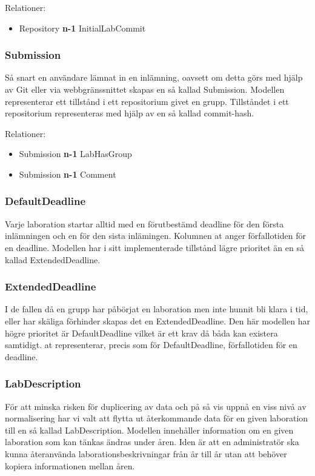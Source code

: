 Relationer: 
\begin{itemize}
  \item Repository {\bf n-1} InitialLabCommit 
\end{itemize}

\subsubsection{Submission}
Så snart en användare lämnat in en inlämning, oavsett om detta görs med hjälp av Git eller via webbgränssnittet skapas en så kallad Submission. Modellen representerar ett tillstånd i ett repositorium givet en grupp. Tillståndet i ett repositorium representeras med hjälp av en så kallad commit-hash.

Relationer: 
\begin{itemize}
  \item Submission {\bf n-1} LabHasGroup 
  \item Submission {\bf n-1} Comment
\end{itemize}

\subsubsection{DefaultDeadline}
Varje laboration startar alltid med en förutbestämd deadline för den första inlämningen och en för den sista inlämingen. Kolumnen at anger förfallotiden för en deadline. Modellen har i sitt implementerade tillstånd lägre prioritet än en så kallad ExtendedDeadline.

\subsubsection{ExtendedDeadline}
I de fallen då en grupp har påbörjat en laboration men inte hunnit bli klara i tid, eller har skäliga förhinder skapas det en ExtendedDeadline. Den här modellen har högre prioritet är DefaultDeadline vilket är ett krav då båda kan existera samtidigt. at representerar, precis som för DefaultDeadline, förfallotiden för en deadline.


\subsubsection{LabDescription}
För att minska risken för duplicering av data och på så vis uppnå en viss nivå av normalisering har vi valt att flytta ut återkommande data för en given laboration till en så kallad LabDescription. Modellen innehåller information om en given laboration som kan tänkas ändras under åren. Iden är att en administratör ska kunna återanvända laborationsbeskrivningar från år till år utan att behöver kopiera informationen mellan åren.


